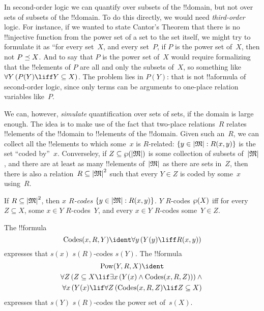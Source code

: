 \documentclass[../../../include/open-logic-section]{subfiles}
\begin{document}


\begin{explain}
In second-order logic we can quantify over subsets of the !!{domain},
but not over sets of subsets of the !!{domain}. To do this directly,
we would need \emph{third-order} logic.  For instance, if we wanted to
state Cantor's Theorem that there is no !!{injective} function from
the power set of a set to the set itself, we might try to formulate it
as ``for every set~$X$, and every set~$P$, if $P$ is the power set
of~$X$, then not $P \preceq X$. And to say that $P$ is the power set
of~$X$ would require formalizing that the !!{element}s of $P$ are all
and only the subsets of~$X$, so something like $\lforall[Y][(P(Y)
  \liff Y \subseteq X)]$. The problem lies in $P(Y)$: that is not
!!a{formula} of second-order logic, since only terms can be arguments
to one-place relation variables like~$P$.

We can, however, \emph{simulate} quantification over sets of sets, if
the domain is large enough.  The idea is to make use of the fact that
two-place relations~$R$ relates !!{element}s of the !!{domain} to
!!{element}s of the !!{domain}. Given such an~$R$, we can collect all
the !!{element}s to which some~$x$ is $R$-related: $\Setabs{y \in
  \Domain{M}}{R(x,y)}$ is the set ``coded by''~$x$.  Converseley, if
$Z \subseteq \Pow{\Domain{M}}$ is some collection of subsets
of~$\Domain{M}$, and there are at least as many !!{element}s
of~$\Domain{M}$ as there are sets in~$Z$, then there is also a
relation~$R \subseteq \Domain{M}^2$ such that every $Y \in Z$ is coded
by some~$x$ using~$R$.
\end{explain}

\begin{defn}
If $R \subseteq \Domain{M}^2$, then \emph{$x$ $R$-codes} $\Setabs{y
  \in \Domain{M}}{R(x, y)}$. $Y$ $R$-codes $\wp(X)$ iff for every $Z
\subseteq X$, some $x \in Y$ $R$-codes~$Y$, and every $x \in Y$
$R$-codes some~$Y \in Z$.
\end{defn}

\begin{prop}
  The !!{formula}
  \[
  \fn{Codes}(x, R, Y) \ident \lforall[y][(Y(y) \liff
    R(x, y))]
  \]
  expresses that $s(x)$ $s(R)$-codes $s(Y)$.  The
!!{formula} 
\begin{multline*}
  \fn{Pow}(Y, R, X) \ident \\
  \lforall[Z][(Z \subseteq X \lif \lexists[x][(Y(x) \land
    \fn{Codes}(x, R, Z))])] \land {} \\ \lforall[x][(Y(x) \lif
  \lforall[Z][(\fn{Codes}(x, R, Z) \lif Z \subseteq X)]]
\end{multline*}
expresses that $s(Y)$ $s(R)$-codes the power set of~$s(X)$.
\end{prop}
\end{document}
